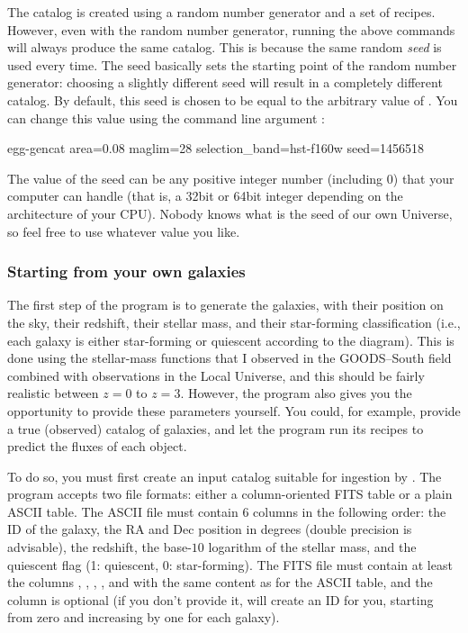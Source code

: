 The catalog is created using a random number generator and a set of recipes. However, even with the random number generator, running the above commands will always produce the same catalog. This is because the same random \emph{seed} is used every time. The seed basically sets the starting point of the random number generator: choosing a slightly different seed will result in a completely different catalog. By default, this seed is chosen to be equal to the arbitrary value of . You can change this value using the command line argument :
\begin{bashcode}
egg-gencat area=0.08 maglim=28 selection_band=hst-f160w seed=1456518
\end{bashcode}
The value of the seed can be any positive integer number (including 0) that your computer can handle (that is, a 32bit or 64bit integer depending on the architecture of your CPU). Nobody knows what is the seed of our own Universe, so feel free to use whatever value you like.

\subsubsection{Starting from your own galaxies}
The first step of the program is to generate the galaxies, with their position on the sky, their redshift, their stellar mass, and their star-forming classification (i.e., each galaxy is either star-forming or quiescent according to the \uvj diagram). This is done using the stellar-mass functions that I observed in the GOODS--South field combined with observations in the Local Universe, and this should be fairly realistic between $z=0$ to $z=3$. However, the program also gives you the opportunity to provide these parameters yourself. You could, for example, provide a true (observed) catalog of galaxies, and let the program run its recipes to predict the fluxes of each object.

To do so, you must first create an input catalog suitable for ingestion by . The program accepts two file formats: either a column-oriented FITS table or a plain ASCII table. The ASCII file must contain $6$ columns in the following order: the ID of the galaxy, the RA and Dec position in degrees (double precision is advisable), the redshift, the base-$10$ logarithm of the stellar mass, and the quiescent flag (1: quiescent, 0: star-forming). The FITS file must contain at least the columns , , , , and  with the same content as for the ASCII table, and the column  is optional (if you don't provide it,  will create an ID for you, starting from zero and increasing by one for each galaxy).

